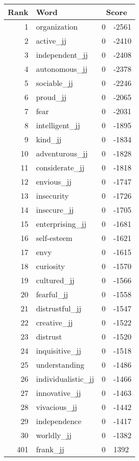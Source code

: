 \begin{longtable}[!htbp]{| rlr@{.}l |}
    \hline
    \textbf{Rank} & \textbf{Word} & \multicolumn{2}{c|}{\textbf{Score}} \\
    \hline
    \endhead
    1 & organization & 0 & -2561 \\
    2 & active\_jj & 0 & -2410 \\
    3 & independent\_jj & 0 & -2408 \\
    4 & autonomous\_jj & 0 & -2378 \\
    5 & sociable\_jj & 0 & -2246 \\
    6 & proud\_jj & 0 & -2065 \\
    7 & fear & 0 & -2031 \\
    8 & intelligent\_jj & 0 & -1895 \\
    9 & kind\_jj & 0 & -1834 \\
    10 & adventurous\_jj & 0 & -1828 \\
    11 & considerate\_jj & 0 & -1818 \\
    12 & envious\_jj & 0 & -1747 \\
    13 & insecurity & 0 & -1726 \\
    14 & insecure\_jj & 0 & -1705 \\
    15 & enterprising\_jj & 0 & -1681 \\
    16 & self-esteem & 0 & -1621 \\
    17 & envy & 0 & -1615 \\
    18 & curiosity & 0 & -1570 \\
    19 & cultured\_jj & 0 & -1566 \\
    20 & fearful\_jj & 0 & -1558 \\
    21 & distrustful\_jj & 0 & -1547 \\
    22 & creative\_jj & 0 & -1522 \\
    23 & distrust & 0 & -1520 \\
    24 & inquisitive\_jj & 0 & -1518 \\
    25 & understanding & 0 & -1486 \\
    26 & individualistic\_jj & 0 & -1466 \\
    27 & innovative\_jj & 0 & -1463 \\
    28 & vivacious\_jj & 0 & -1442 \\
    29 & independence & 0 & -1417 \\
    30 & worldly\_jj & 0 & -1382 \\
    401 & frank\_jj & 0 & 1392 \\

\end{longtable}
